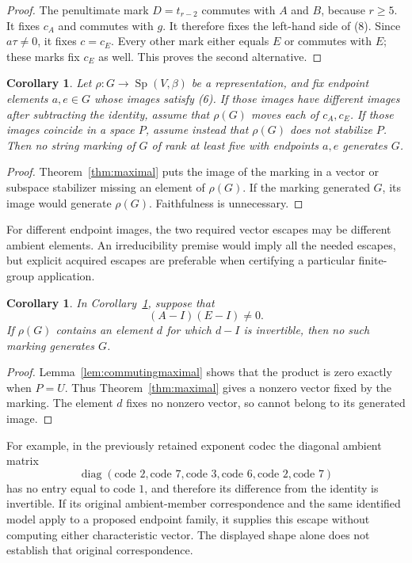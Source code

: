 \documentclass[11pt]{article}
\newtheorem{corollary}[theorem]{Corollary}
\newcommand{\Sp}{\operatorname{Sp}}
\begin{document}
\begin{proof}
The penultimate mark \(D=t_{r-2}\) commutes with \(A\) and \(B\),
because \(r\geq5\). It fixes \(c_A\) and commutes with \(g\).
It therefore fixes the left-hand side of (8).
Since \(a\tau\ne0\), it fixes \(c=c_E\).
Every other mark either equals \(E\) or commutes with \(E\);
these marks fix \(c_E\) as well.
This proves the second alternative.
\end{proof}

\begin{corollary}\label{cor:originalgroup}
Let \(\rho:G\to\Sp(V,\beta)\) be a representation, and fix
endpoint elements \(a,e\in G\) whose images satisfy (6).
If those images have different images after subtracting the identity,
assume that \(\rho(G)\) moves each of \(c_A,c_E\).
If those images coincide in a space \(P\), assume instead that
\(\rho(G)\) does not stabilize \(P\).
Then no string marking of \(G\) of rank at least five with endpoints
\(a,e\) generates \(G\).
\end{corollary}
\begin{proof}
Theorem~\ref{thm:maximal} puts the image of the marking in a
vector or subspace stabilizer missing an element of \(\rho(G)\).
If the marking generated \(G\), its image would generate \(\rho(G)\).
Faithfulness is unnecessary.
\end{proof}

For different endpoint images, the two required vector escapes may
be different ambient elements. An irreducibility premise would imply
all the needed escapes, but explicit acquired escapes are preferable
when certifying a particular finite-group application.

\begin{corollary}\label{cor:oneambient}
In Corollary~\ref{cor:originalgroup}, suppose that
\[
                     (A-I)(E-I)\ne0.
\]
If \(\rho(G)\) contains an element \(d\) for which \(d-I\) is
invertible, then no such marking generates \(G\).
\end{corollary}
\begin{proof}
Lemma~\ref{lem:commutingmaximal} shows that the product is zero
exactly when \(P=U\). Thus Theorem~\ref{thm:maximal} gives a
nonzero vector fixed by the marking. The element \(d\) fixes no
nonzero vector, so cannot belong to its generated image.
\end{proof}

For example, in the previously retained exponent codec the diagonal
ambient matrix
\[
 \operatorname{diag}(\text{code }2,\text{code }7,\text{code }3,
                     \text{code }6,\text{code }2,\text{code }7)
\]
has no entry equal to code \(1\), and therefore its difference
from the identity is invertible. If its original ambient-member
correspondence and the same identified model apply to a proposed
endpoint family, it supplies this escape without computing either
characteristic vector. The displayed shape alone does not establish
that original correspondence.
\end{document}
